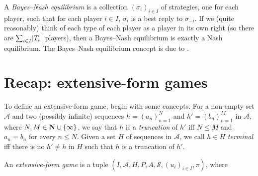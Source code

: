 \documentclass[11pt,letterpaper,reqno,oneside]{book}
\begin{document}
A \emph{Bayes--Nash equilibrium} is a collection $(\sigma_i)_{i \in I}$ of strategies, one for each player, such that for each player $i \in I$, $\sigma_i$ is a best reply to $\sigma_{-i}$. If we (quite reasonably) think of each type of each player as a player in its own right (so there are $\sum_{i \in I} \abs*{T_i}$ players), then a Bayes--Nash equilibrium is exactly a Nash equilibrium. The Bayes--Nash equilibrium concept is due to \textcite{Harsanyi1967,Harsanyi1968a,Harsanyi1968b}.



\section{Recap: extensive-form games}
\label{ch0:extensive}

To define an extensive-form game, begin with some concepts. For a non-empty set $\mathcal{A}$ and two (possibly infinite) sequences $h = (a_n)_{n=1}^N$ and $h' = (b_n)_{n=1}^M$ in $\mathcal{A}$, where $N,M \in \mathbf{N} \cup \{\infty\}$, we say that $h$ is a \emph{truncation} of $h'$ iff $N \leq M$ and $a_n = b_n$ for every $n \leq N$. Given a set $H$ of sequences in $\mathcal{A}$, we call $h \in H$ \emph{terminal} iff there is no $h' \neq h$ in $H$ such that $h$ is a truncation of $h'$.

An \emph{extensive-form game} is a tuple $(I,\mathcal{A},H,P,A,\mathcal{S},(u_i)_{i \in I},\pi)$, where
\end{document}
